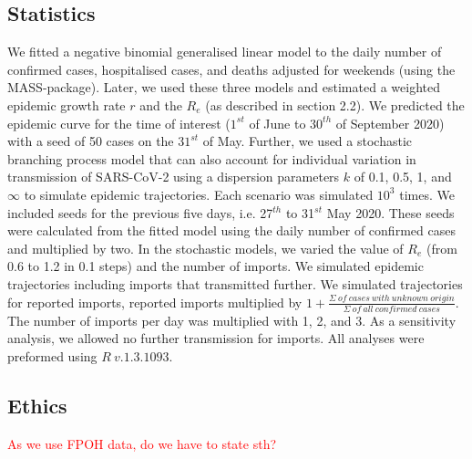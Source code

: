 \documentclass[10pt, a4paper, twoside]{article}
\begin{document}
\begin{multicols}{2}
\subsection{Statistics}
We fitted a negative binomial generalised linear model to the daily number of confirmed cases, hospitalised cases, and deaths adjusted for weekends (using the MASS-package).\cite{venables_modern_2002} 
Later, we used these three models and estimated a weighted epidemic growth rate $r$ and the $R_e$ (as described in section 2.2). 
We predicted the epidemic curve for the time of interest ($1^{st}$ of June to $30^{th}$ of September 2020) with a seed of 50 cases on the $31^{st}$ of May. 
Further, we used a stochastic branching process model that can also account for individual variation in transmission of SARS-CoV-2 using a dispersion parameters $k$ of 0.1, 0.5, 1, and  $\infty$ to simulate epidemic trajectories. 
Each scenario was simulated $10^3$ times.
We included seeds for the previous five days, i.e. 27$^{th}$ to 31$^{st}$ May 2020.
These seeds were calculated from the fitted model using the daily number of confirmed cases and multiplied by two.
In the stochastic models, we varied the value of $R_e$ (from 0.6 to 1.2 in 0.1 steps) and the number of imports.
We simulated epidemic trajectories including imports that transmitted further. 
We simulated trajectories for reported imports, reported imports multiplied by $1+ \frac{\Sigma ~of ~cases ~with ~unknown ~origin }{\Sigma ~of ~all ~confirmed ~cases}$. 
The number of imports per day was multiplied with 1, 2, and 3. 
As a sensitivity analysis, we allowed no further transmission for imports. 
All analyses were preformed using $R ~v.1.3.1093$.\cite{r_core_team_r_2020}


\subsection{Ethics}
\textcolor{red}{As we use FPOH data, do we have to state sth?}


\end{multicols}
\end{document}
